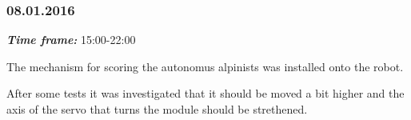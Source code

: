 \subsubsection{08.01.2016}
\textit{\textbf{Time frame:}} 15:00-22:00 

The mechanism for scoring the autonomus alpinists was installed onto the robot. 

After some tests it was investigated that it should be moved a bit higher and the axis of the servo that turns the module should be strethened.
